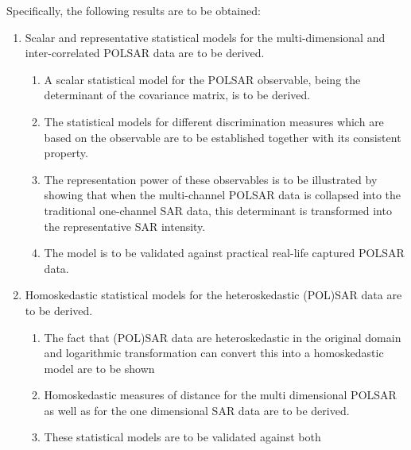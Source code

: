Specifically, the following results are to be obtained:
\begin{enumerate}
\item                Scalar and representative statistical models
                for the multi-dimensional and inter-correlated POLSAR
                data are to be derived.
                \begin{enumerate}
                \item \label{itm:polsar_model} A scalar statistical model for the
                POLSAR observable, being the determinant of the
                covariance matrix, is to be derived.
                \item \label{itm:polsar_discrimination_measure} The statistical models for different discrimination measures which are based on
                the observable are to be established together with its consistent property. %
                \item \label{itm:polsar_include_sar} The representation power of these observables is to be illustrated by showing
                that when the multi-channel POLSAR data is collapsed
                into the traditional one-channel SAR data, this
                determinant is transformed into the representative SAR
                intensity.
                \item \label{itm:polsar_validation} The model is to be validated against practical real-life
                captured POLSAR data.
                \end{enumerate}
\item                Homoskedastic statistical models for the
                heteroskedastic (POL)SAR data are to be derived. 
                \begin{enumerate}
                \item \label{itm:log_transform} The fact that (POL)SAR data are heteroskedastic in
                the original domain and logarithmic transformation
                can convert this into a homoskedastic model are to be shown
                \item \label{itm:sar_measures_distance} Homoskedastic measures of distance for
                the multi dimensional POLSAR as well as for the one
                dimensional SAR data are to be derived.
                \item \label{itm:sar_validation} These statistical models are to be validated against both

\end{enumerate}
\end{enumerate}
